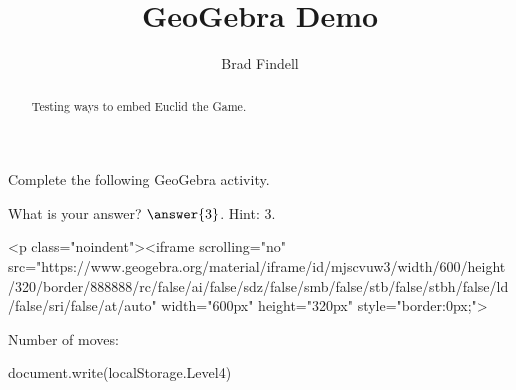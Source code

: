 \documentclass[nooutcomes]{ximera}
\title{GeoGebra Demo}
\author{Brad Findell}
\begin{document}
\begin{abstract}
Testing ways to embed Euclid the Game. 
\end{abstract}
\maketitle


\begin{problem}
Complete the following GeoGebra activity.  

What is your answer? $\answer{3}$.  Hint: 3. 


<p class="noindent"><iframe scrolling="no" src="https://www.geogebra.org/material/iframe/id/mjscvuw3/width/600/height/320/border/888888/rc/false/ai/false/sdz/false/smb/false/stb/false/stbh/false/ld/false/sri/false/at/auto" width="600px" height="320px" style="border:0px;">


Number of moves: 
\begin{javascript}
document.write(localStorage.Level4)
\end{javascript}


\end{problem}

%
%
%
%
\end{document}
